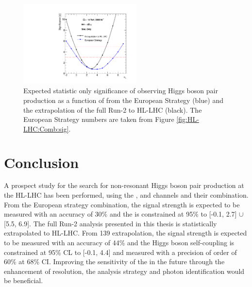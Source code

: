 \begin{figure}[htbp]
    \centering
    \includegraphics[width=0.55\textwidth]{Ch6/Img/sig.pdf}
    \begin{tcolorbox}[colback=black!5!white, colframe=white!75!black]
    \caption{Expected statistic only significance of observing Higgs boson pair production as a function of \kl from the European Strategy \bbyy (blue) and the extrapolation of the full Run-2 \bbyy to HL-LHC (black). The European Strategy numbers are taken from Figure \ref{fig:HL-LHC:Comb:sig}.}
    \label{fig:HL-LHC:Sig}
    \end{tcolorbox}
\end{figure}

\section{Conclusion}

A prospect study for the search for non-resonant Higgs boson pair production at the HL-LHC has been performed, using the \bbbb, \bbyy and \bbtt channels and their combination. From the European strategy combination, the signal strength is expected to be measured with an accuracy of 30\% and the \kl is constrained at 95\% to [-0.1, 2.7] $\cup$ [5.5, 6.9]. The full Run-2 \HHyybb analysis presented in this thesis is statistically extrapolated to HL-LHC. From 139 \ifb \HHyybb extrapolation, the signal strength is expected to be measured with an accuracy of 44\% and the Higgs boson self-coupling is constrained at 95\% CL to [-0.1, 4.4] and measured with a precision of order of 60\% at 68\% CI. Improving the sensitivity of the \HHyybb in the future through the enhancement of \mbb resolution, the analysis strategy and photon identification would be beneficial.  
